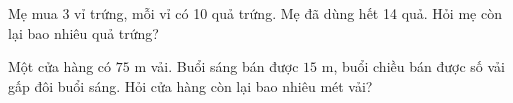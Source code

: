 \begin{ex} %
Mẹ mua 3 vỉ trứng, mỗi vỉ có 10 quả trứng. Mẹ đã dùng hết 14 quả. Hỏi mẹ còn lại bao nhiêu quả trứng?
\end{ex}

\begin{ex} %
Một cửa hàng có $75\text{ m}$ vải. Buổi sáng bán được $15\text{ m}$, buổi chiều bán được số vải gấp đôi buổi sáng. Hỏi cửa hàng còn lại bao nhiêu mét vải?
\end{ex}

